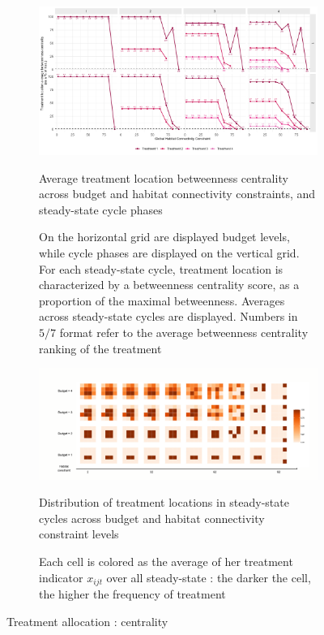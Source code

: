 \begin{figure}[H]
     \centering
     \begin{subfigure}[b]{\textwidth}
         \centering
         \includegraphics[width=\textwidth]{figures/wildland/betweenness_treatment.jpg}
         \caption{Average treatment location betweenness centrality across budget and habitat connectivity constraints, and steady-state cycle phases}
         \caption*{On the horizontal grid are displayed budget levels, while cycle phases are displayed on the vertical grid. For each steady-state cycle, treatment location is characterized by a betweenness centrality score, as a proportion of the maximal betweenness. Averages across steady-state cycles are displayed. Numbers in $5/7$ format refer to the average betweenness centrality ranking of the treatment} 
         \label{fig:between}
     \end{subfigure}
     \begin{subfigure}[b]{\textwidth}
              \centering
		\includegraphics[width=\textwidth]{figures/wildland/average_treatments_legend.pdf}
    		  \caption{Distribution of treatment locations in steady-state cycles across budget and habitat connectivity constraint levels}
    		  \caption*{Each cell is colored as the average of her treatment indicator $x_{ijt}$ over all steady-state : the darker the cell, the higher the frequency of treatment}
     \label{fig:treatments_location}
     \end{subfigure}
     \caption{Treatment allocation : centrality}
     \label{fig:centrality}
\end{figure}

